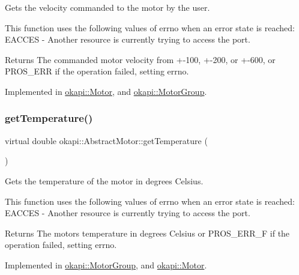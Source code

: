 Gets the velocity commanded to the motor by the user.

This function uses the following values of errno when an error state is reached\+: E\+A\+C\+C\+ES -\/ Another resource is currently trying to access the port.

\begin{DoxyReturn}{Returns}
The commanded motor velocity from +-\/100, +-\/200, or +-\/600, or P\+R\+O\+S\+\_\+\+E\+RR if the operation failed, setting errno. 
\end{DoxyReturn}


Implemented in \mbox{\hyperlink{classokapi_1_1Motor_aee4697f4e1f39bc0206062d0247caf47}{okapi\+::\+Motor}}, and \mbox{\hyperlink{classokapi_1_1MotorGroup_a841736ae664104fb38ffff33ef763394}{okapi\+::\+Motor\+Group}}.

\mbox{\label{classokapi_1_1AbstractMotor_a96ef2dc7eeb1ac23713e3e37af9e95f2}} 
\subsubsection{\texorpdfstring{getTemperature()}{getTemperature()}}
{\footnotesize\ttfamily virtual double okapi\+::\+Abstract\+Motor\+::get\+Temperature (\begin{DoxyParamCaption}{ }\end{DoxyParamCaption})\hspace{0.3cm}{\ttfamily [pure virtual]}}

Gets the temperature of the motor in degrees Celsius.

This function uses the following values of errno when an error state is reached\+: E\+A\+C\+C\+ES -\/ Another resource is currently trying to access the port.

\begin{DoxyReturn}{Returns}
The motor\textquotesingle{}s temperature in degrees Celsius or P\+R\+O\+S\+\_\+\+E\+R\+R\+\_\+F if the operation failed, setting errno. 
\end{DoxyReturn}


Implemented in \mbox{\hyperlink{classokapi_1_1MotorGroup_acba91d770dbc7e38f59070e8d5957d6d}{okapi\+::\+Motor\+Group}}, and \mbox{\hyperlink{classokapi_1_1Motor_ab5b9208b001c1ab49f8c058eff58e5b3}{okapi\+::\+Motor}}.

\mbox{\label{classokapi_1_1AbstractMotor_a955818baa689b279b36dda6a74f15d4e}} 
